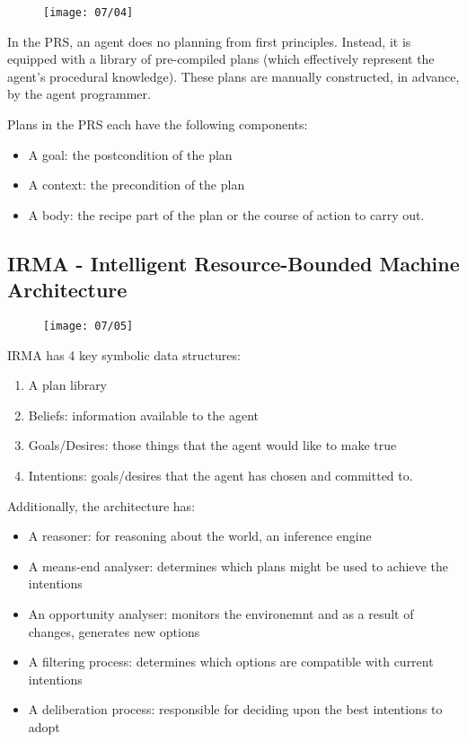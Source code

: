 \begin{figure}[!h]
\centering
\texttt{[image: 07/04]}
\end{figure}

In the PRS, an agent does no planning from first principles. Instead, it is equipped with a library of pre-compiled plans (which effectively represent the agent's procedural knowledge). These plans are manually constructed, in advance, by the agent programmer.

Plans in the PRS each have the following components:
\begin{itemize}
\item A goal: the postcondition of the plan
\item A context: the precondition of the plan
\item A body: the recipe part of the plan or the course of action to carry out.
\end{itemize}
\subsection{IRMA - Intelligent Resource-Bounded Machine Architecture}
\begin{figure}[!h]
\centering
\texttt{[image: 07/05]}
\end{figure}
IRMA has 4 key symbolic data structures:
\begin{enumerate}
\item A plan library
\item Beliefs: information available to the agent
\item Goals/Desires: those things that the agent would like to make true
\item Intentions: goals/desires that the agent has chosen and committed to.
\end{enumerate}

Additionally, the architecture has:
\begin{itemize}
\item A reasoner: for reasoning about the world, an inference engine
\item A means-end analyser: determines which plans might be used to achieve the intentions
\item An opportunity analyser: monitors the environemnt and as a result of changes, generates new options
\item A filtering process: determines which options are compatible with current intentions
\item A deliberation process: responsible for deciding upon the best intentions to adopt
\end{itemize}



